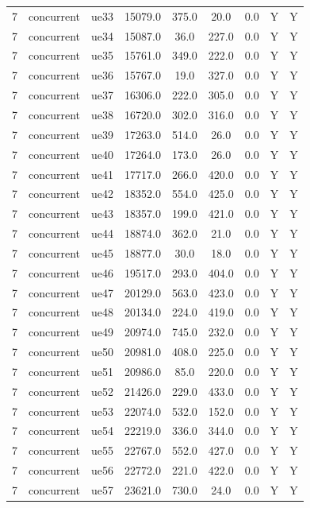 \begin{table}[ht]
\begin{tabular}{|c|c|c|c|c|c|c|c|c|}
7 & concurrent & ue33 & 15079.0 & 375.0 & 20.0 & 0.0 & Y & Y \\
7 & concurrent & ue34 & 15087.0 & 36.0 & 227.0 & 0.0 & Y & Y \\
7 & concurrent & ue35 & 15761.0 & 349.0 & 222.0 & 0.0 & Y & Y \\
7 & concurrent & ue36 & 15767.0 & 19.0 & 327.0 & 0.0 & Y & Y \\
7 & concurrent & ue37 & 16306.0 & 222.0 & 305.0 & 0.0 & Y & Y \\
7 & concurrent & ue38 & 16720.0 & 302.0 & 316.0 & 0.0 & Y & Y \\
7 & concurrent & ue39 & 17263.0 & 514.0 & 26.0 & 0.0 & Y & Y \\
7 & concurrent & ue40 & 17264.0 & 173.0 & 26.0 & 0.0 & Y & Y \\
7 & concurrent & ue41 & 17717.0 & 266.0 & 420.0 & 0.0 & Y & Y \\
7 & concurrent & ue42 & 18352.0 & 554.0 & 425.0 & 0.0 & Y & Y \\
7 & concurrent & ue43 & 18357.0 & 199.0 & 421.0 & 0.0 & Y & Y \\
7 & concurrent & ue44 & 18874.0 & 362.0 & 21.0 & 0.0 & Y & Y \\
7 & concurrent & ue45 & 18877.0 & 30.0 & 18.0 & 0.0 & Y & Y \\
7 & concurrent & ue46 & 19517.0 & 293.0 & 404.0 & 0.0 & Y & Y \\
7 & concurrent & ue47 & 20129.0 & 563.0 & 423.0 & 0.0 & Y & Y \\
7 & concurrent & ue48 & 20134.0 & 224.0 & 419.0 & 0.0 & Y & Y \\
7 & concurrent & ue49 & 20974.0 & 745.0 & 232.0 & 0.0 & Y & Y \\
7 & concurrent & ue50 & 20981.0 & 408.0 & 225.0 & 0.0 & Y & Y \\
7 & concurrent & ue51 & 20986.0 & 85.0 & 220.0 & 0.0 & Y & Y \\
7 & concurrent & ue52 & 21426.0 & 229.0 & 433.0 & 0.0 & Y & Y \\
7 & concurrent & ue53 & 22074.0 & 532.0 & 152.0 & 0.0 & Y & Y \\
7 & concurrent & ue54 & 22219.0 & 336.0 & 344.0 & 0.0 & Y & Y \\
7 & concurrent & ue55 & 22767.0 & 552.0 & 427.0 & 0.0 & Y & Y \\
7 & concurrent & ue56 & 22772.0 & 221.0 & 422.0 & 0.0 & Y & Y \\
7 & concurrent & ue57 & 23621.0 & 730.0 & 24.0 & 0.0 & Y & Y \\

\end{tabular}
\end{table}
